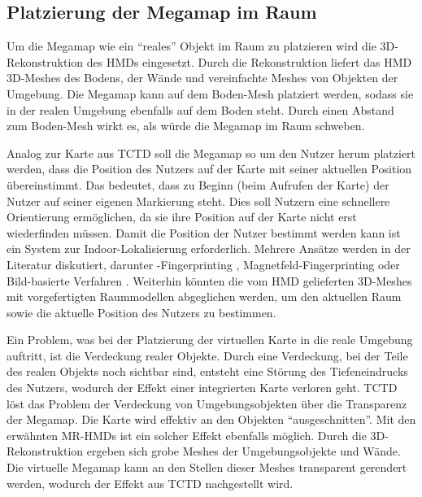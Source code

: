 \subsection{Platzierung der Megamap im Raum}
Um die Megamap wie ein \enquote{reales} Objekt im Raum zu platzieren wird die 3D-Rekonstruktion des HMDs eingesetzt.
Durch die Rekonstruktion liefert das HMD 3D-Meshes des Bodens, der Wände und vereinfachte Meshes von Objekten der Umgebung.
Die Megamap kann auf dem Boden-Mesh platziert werden, sodass sie in der realen Umgebung ebenfalls auf dem Boden steht.
Durch einen Abstand zum Boden-Mesh wirkt es, als würde die Megamap im Raum schweben.

Analog zur Karte aus TCTD soll die Megamap so um den Nutzer herum platziert werden, dass die Position des Nutzers auf der Karte mit seiner aktuellen Position übereinstimmt.
Das bedeutet, dass zu Beginn (beim Aufrufen der Karte) der Nutzer auf seiner eigenen Markierung steht.
Dies soll Nutzern eine schnellere Orientierung ermöglichen, da sie ihre Position auf der Karte nicht erst wiederfinden müssen.
Damit die Position der Nutzer bestimmt werden kann ist ein System zur Indoor-Lokalisierung erforderlich.
Mehrere Ansätze werden in der Literatur diskutiert, darunter \wifi-Fingerprinting \parencite{Lautenschlaeger2012, Alnabhan2014}, Magnetfeld-Fingerprinting \parencite{Hashish2017, Ang2018} oder Bild-basierte Verfahren \parencite{Kalkusch2002, Moeller2014, Silva2015}.
Weiterhin könnten die vom HMD gelieferten 3D-Meshes mit vorgefertigten Raummodellen abgeglichen werden, um den aktuellen Raum sowie die aktuelle Position des Nutzers zu bestimmen.

Ein Problem, was bei der Platzierung der virtuellen Karte in die reale Umgebung auftritt, ist die Verdeckung realer Objekte.
Durch eine Verdeckung, bei der Teile des realen Objekts noch sichtbar sind, entsteht eine Störung des Tiefeneindrucks des Nutzers, wodurch der Effekt einer integrierten Karte verloren geht.
TCTD löst das Problem der Verdeckung von Umgebungsobjekten über die Transparenz der Megamap.
Die Karte wird effektiv an den Objekten \enquote{ausgeschnitten}.
Mit den erwähnten MR-HMDs ist ein solcher Effekt ebenfalls möglich.
Durch die 3D-Rekonstruktion ergeben sich grobe Meshes der Umgebungsobjekte und Wände.
Die virtuelle Megamap kann an den Stellen dieser Meshes transparent gerendert werden, wodurch der Effekt aus TCTD nachgestellt wird.


